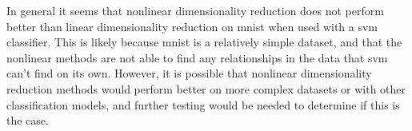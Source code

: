In general it seems that nonlinear dimensionality reduction does not perform better than linear dimensionality reduction on \gls{mnist} when used with a \gls{svm} classifier. This is likely because \gls{mnist} is a relatively simple dataset, and that the nonlinear methods are not able to find any relationships in the data that \gls{svm} can't find on its own. However, it is possible that nonlinear dimensionality reduction methods would perform better on more complex datasets or with other classification models, and further testing would be needed to determine if this is the case.
